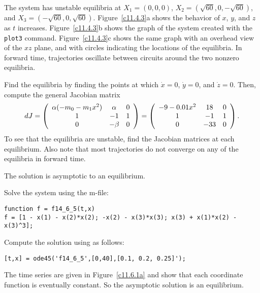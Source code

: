 \documentclass{ximera}
\begin{document}
\ans The system has unstable equilibria at $X_1 = (0,0,0)$,
$X_2 = (\sqrt{60},0, -\sqrt{60})$, and $X_3 = (-\sqrt{60},0,\sqrt{60})$.
Figure~\ref{c11.4.3}a shows the behavior of $x$, $y$, and $z$ as $t$
increases.  Figure~\ref{c11.4.3}b shows the graph of the system created
with the {\tt plot3} command.  Figure~\ref{c11.4.3}c shows the same graph
with an overhead view of the $xz$ plane, and with circles indicating the
locations of the equilibria.  In forward time, trajectories oscillate
between circuits around the two nonzero equilibria.

\soln Find the equilibria by finding the points at which $\dot{x} = 0$,
$\dot{y} = 0$, and $\dot{z} = 0$.  Then, compute the general Jacobian
matrix
\[
dJ = \left(\begin{array}{ccc} \alpha(-m_0 - m_1x^2) & \alpha & 0 \\ 1 & -1 & 1 \\ 0 & -\beta & 0\end{array}\right)
= \left(\begin{array}{ccc} -9 - 0.01x^2 & 18 & 0 \\ 1 & -1 & 1 \\ 0 & -33 & 0\end{array}\right).
\]
To see that the equilibria are unstable, find the Jacobian matrices at
each equilibrium.  Also note that most trajectories do not converge on
any of the equilibria in forward time.

\begin{figure}[htb]
                       \centerline{%
			\hspace{0.5in}
			\hspace{0.3in}
                       }
\end{figure}

 \ans The solution is asymptotic to an equilibrium.

\soln Solve the system using the m-file:
\begin{verbatim}
function f = f14_6_5(t,x)
f = [1 - x(1) - x(2)*x(2); -x(2) - x(3)*x(3); x(3) + x(1)*x(2) - x(3)^3];
\end{verbatim}

Compute the solution using \Matlab as follows:
\begin{verbatim}
[t,x] = ode45('f14_6_5',[0,40],[0.1, 0.2, 0.25]');
\end{verbatim}
\begin{figure}[htb]
     \centerline{%
     }
\end{figure}
The time series are given in Figure~\ref{c11.6.1a} and show
that each coordinate function is eventually constant.  So the asymptotic
solution is an equilibrium.
\end{document}
